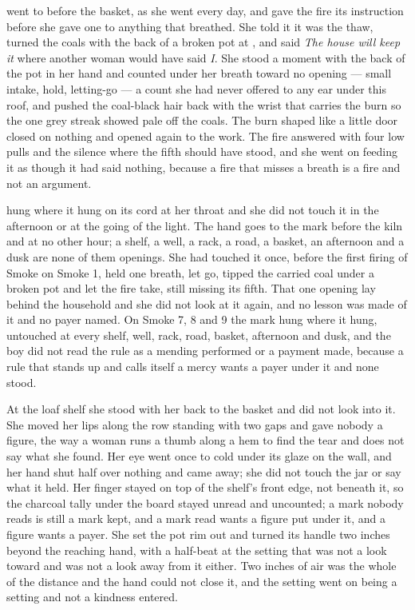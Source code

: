  went to  before the basket, as she went every day, and gave the fire its instruction before she gave one to anything that breathed. She told it it was the thaw, turned the coals with the back of a broken pot at , and said \emph{The house will keep it} where another woman would have said \emph{I}. She stood a moment with the back of the pot in her hand and counted under her breath toward no opening --- small intake, hold, letting-go --- a count she had never offered to any ear under this roof, and pushed the coal-black hair back with the wrist that carries the burn so the one grey streak showed pale off the coals. The burn shaped like a little door closed on nothing and opened again to the work. The fire answered with four low pulls and the silence where the fifth should have stood, and she went on feeding it as though it had said nothing, because a fire that misses a breath is a fire and not an argument.

 hung where it hung on its cord at her throat and she did not touch it in the afternoon or at the going of the light. The hand goes to the mark before the kiln and at no other hour; a shelf, a well, a rack, a road, a basket, an afternoon and a dusk are none of them openings. She had touched it once, before the first firing of Smoke on Smoke 1, held one breath, let go, tipped the carried coal under a broken pot and let the fire take, still missing its fifth. That one opening lay behind the household and she did not look at it again, and no lesson was made of it and no payer named. On Smoke 7, 8 and 9 the mark hung where it hung, untouched at every shelf, well, rack, road, basket, afternoon and dusk, and the boy did not read the rule as a mending performed or a payment made, because a rule that stands up and calls itself a mercy wants a payer under it and none stood.

At the loaf shelf she stood with her back to the basket and did not look into it. She moved her lips along the row standing with two gaps and gave nobody a figure, the way a woman runs a thumb along a hem to find the tear and does not say what she found. Her eye went once to  cold under its glaze on the wall, and her hand shut half over nothing and came away; she did not touch the jar or say what it held. Her finger stayed on top of the shelf's front edge, not beneath it, so the charcoal tally under the board stayed unread and uncounted; a mark nobody reads is still a mark kept, and a mark read wants a figure put under it, and a figure wants a payer. She set the pot rim out and turned its handle two inches beyond the reaching hand, with a half-beat at the setting that was not a look toward  and was not a look away from it either. Two inches of air was the whole of the distance and the hand could not close it, and the setting went on being a setting and not a kindness entered.


